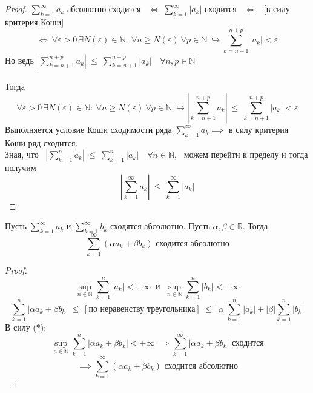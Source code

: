 \documentclass[11pt]{article}
\begin{document}
\begin{proof}
  $\displaystyle \sum_{k = 1}^{\infty} a_k$ абсолютно сходится \ 
  $\Longleftrightarrow \ \displaystyle \sum_{k = 1}^{\infty} 
  \left\lvert a_k \right\rvert$ сходится \ $\Longleftrightarrow$ \ [в силу 
  критерия Коши]
  \[\Longleftrightarrow \ \forall \varepsilon > 0 \ \exists N(\varepsilon) 
  \in \mathbb{N}: \ \forall n \geq N(\varepsilon) \ \forall p \in \mathbb{N} 
  \ \hookrightarrow \sum_{k = n + 1}^{n + p} \left\lvert a_k \right\rvert 
  < \varepsilon\]
  Но ведь $\left\lvert \displaystyle \sum_{k = n + 1}^{n + p} a_k \right\rvert 
  \ \leq \ \displaystyle \sum_{k = n + 1}^{n + p} \left\lvert a_k \right\rvert 
  \quad \forall n, p \in \mathbb{N}$ \\ \\
  Тогда 
  \[\forall \varepsilon > 0 \ \exists N(\varepsilon) \in \mathbb{N}: \ 
  \forall n \geq N(\varepsilon) \ \forall p \in \mathbb{N} \ \hookrightarrow 
  \left\lvert \sum_{k = n + 1}^{n + p} a_k \right\rvert \ \leq \ 
  \sum_{k = n + 1}^{n + p} \left\lvert a_k \right\rvert < \varepsilon\]
  Выполняется условие Коши сходимости ряда $\displaystyle \sum_{k = 1}^{\infty} 
  a_k \implies$ в силу критерия Коши ряд сходится. \\
  Зная, что \ $\left\lvert \displaystyle \sum_{k = 1}^{n} a_k \right\rvert \ 
  \leq \ \displaystyle \sum_{k = 1}^{n} \left\lvert a_k \right\rvert \quad 
  \forall n \in \mathbb{N}$, \ можем перейти к пределу и тогда получим 
  \[\left\lvert \sum_{k = 1}^{\infty} a_k \right\rvert \ \leq \ 
  \sum_{k = 1}^{\infty} \left\lvert a_k \right\rvert\]
\end{proof}

\begin{theorem}
  Пусть $\displaystyle \sum_{k = 1}^{\infty} a_k$ и $\displaystyle 
  \sum_{k = 1}^{\infty} b_k$ сходятся абсолютно. Пусть $\alpha, \beta \in 
  \mathbb{R}$. Тогда \[\sum_{k = 1}^{\infty} (\alpha a_k + \beta b_k) 
  \text{ сходится абсолютно}\]
\end{theorem}

\begin{proof}
  \[\sup_{n \in \mathbb{N}} \sum_{k = 1}^{n} \left\lvert a_k \right\rvert < 
  + \infty \ \text{ и } \ \sup_{n \in \mathbb{N}} \sum_{k = 1}^{n} \left\lvert 
  b_k \right\rvert < + \infty \tag{$\ast$}\]
  \[\sum_{k = 1}^{n} \left\lvert \alpha a_k + \beta b_k \right\rvert \ \leq \ 
  [\text{по неравенству треугольника}] \ \leq \ \left\lvert \alpha \right\rvert 
  \sum_{k = 1}^{n} \left\lvert a_k \right\rvert + \left\lvert \beta 
  \right\rvert \sum_{k = 1}^{n} \left\lvert b_k \right\rvert\]
  В силу ($\ast$):
  \[\sup_{n \in \mathbb{N}} \sum_{k = 1}^{n} \left\lvert \alpha a_k + \beta 
  b_k \right\rvert < + \infty \implies \sum_{k = 1}^{\infty} \left\lvert 
  \alpha a_k + \beta b_k \right\rvert \text{ сходится}\]
  \[\implies \sum_{k = 1}^{\infty} (\alpha a_k + \beta b_k) 
  \text{ сходится абсолютно}\]
\end{proof}
\end{document}

